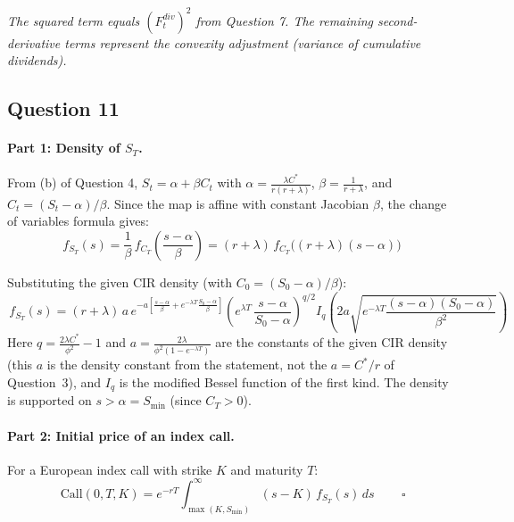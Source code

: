\documentclass[12pt,a4paper]{article}
\begin{document}
\textit{The squared term equals $(F_t^{div})^2$ from Question 7. The remaining second-derivative terms represent the convexity adjustment (variance of cumulative dividends).}

\subsection*{Question 11}

\paragraph{Part 1: Density of $S_T$.}
From (b) of Question 4, $S_t = \alpha + \beta C_t$ with $\alpha = \frac{\lambda C^*}{r(r+\lambda)}$, $\beta = \frac{1}{r+\lambda}$, and $C_t = (S_t - \alpha)/\beta$. Since the map is affine with constant Jacobian $\beta$, the change of variables formula gives:
\begin{equation*}
    f_{S_T}(s) = \frac{1}{\beta}\,f_{C_T}\!\left(\frac{s - \alpha}{\beta}\right) = (r+\lambda)\,f_{C_T}\!\big((r+\lambda)(s - \alpha)\big)
\end{equation*}

Substituting the given CIR density (with $C_0 = (S_0 - \alpha)/\beta$):
\begin{equation*}
    \boxed{\,f_{S_T}(s) = (r+\lambda)\,a\,e^{-a\!\left[\frac{s-\alpha}{\beta} + e^{-\lambda T}\frac{S_0 - \alpha}{\beta}\right]}\!\left(e^{\lambda T}\,\frac{s-\alpha}{S_0 - \alpha}\right)^{\!q/2}\!\!I_q\!\left(2a\sqrt{e^{-\lambda T}\frac{(s-\alpha)(S_0-\alpha)}{\beta^2}}\right)\,}
\end{equation*}
Here $q = \frac{2\lambda C^*}{\phi^2}-1$ and $a = \frac{2\lambda}{\phi^2\left(1-e^{-\lambda T}\right)}$ are the constants of the given CIR density (this $a$ is the density constant from the statement, not the $a=C^*/r$ of Question~3), and $I_q$ is the modified Bessel function of the first kind. The density is supported on $s > \alpha = S_{\min}$ (since $C_T > 0$).

\paragraph{Part 2: Initial price of an index call.}
For a European index call with strike $K$ and maturity $T$:
\begin{equation*}
    \boxed{\,\mathrm{Call}(0, T, K) = e^{-rT}\!\int_{\max(K, S_{\min})}^\infty\!\!(s - K)\,f_{S_T}(s)\,ds\,} \qquad \square
\end{equation*}
\end{document}
